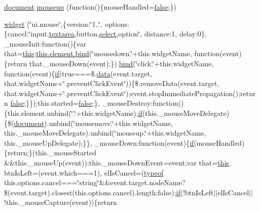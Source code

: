 \begin{DoxyCompactItemize}
\item 
\hyperlink{outside_events_8js_aa14f8e0338cced6720590fd2ea13bd4b}{document} \hyperlink{jquery-ui_8js_a80a041c978d0e433fcd1aa8c4aa91f89}{mouseup} (function()\{mouse\+Handled=\hyperlink{validate_8js_a5df37b7f02e5cdc7d9412b7f872b8e01}{false};\})
\item 
\hyperlink{jquery-ui_8js_a40acf44faeb2d1a4fc7e91ac84caecdc}{widget} (\char`\"{}ui.\+mouse\char`\"{},\{version\+:\char`\"{}1..\char`\"{}, options\+:\{cancel\+:\char`\"{}input,\hyperlink{validate_8js_a7238bc4fc70c702e90c5c654ff465b8d}{textarea},button,\hyperlink{validate_8js_a107b4864f70df98ef4a521c0b2bc80c7}{select},option\char`\"{}, distance\+:1, delay\+:0\}, \+\_\+mouse\+Init\+:function()\{var that=\hyperlink{tinymce_8jquery_8dev_8js_a05c09a5e9d53fa7adf0a7936038c2fa3}{this};\hyperlink{jquery_8mobile-1_83_81_8js_aa28c4555fcf1f84917a1d70644f7174f}{this.\+element.\+bind}(\char`\"{}mousedown.\char`\"{}+this.\+widget\+Name, function(event)\{return that.\+\_\+mouse\+Down(event);\}).\hyperlink{jquery_8mobile-1_83_81_8js_aa28c4555fcf1f84917a1d70644f7174f}{bind}(\char`\"{}click.\char`\"{}+this.\+widget\+Name, function(event)\{\hyperlink{fullpage_2plugin_8js_a8b98017e64ef036adb9ae327ff94abe1}{if}(true===\$.\hyperlink{fullpage_2plugin_8js_a718c1bf5a3bf21ebb980203b142e5b75}{data}(event.\+target, that.\+widget\+Name+\char`\"{}.prevent\+Click\+Event\char`\"{}))\{\$.remove\+Data(event.\+target, that.\+widget\+Name+\char`\"{}.prevent\+Click\+Event\char`\"{});event.\+stop\+Immediate\+Propagation();return \hyperlink{validate_8js_a5df37b7f02e5cdc7d9412b7f872b8e01}{false};\}\});this.\+started=\hyperlink{validate_8js_a5df37b7f02e5cdc7d9412b7f872b8e01}{false};\}, \+\_\+mouse\+Destroy\+:function()\{this.\+element.\+unbind(\char`\"{}.\char`\"{}+this.\+widget\+Name);\hyperlink{fullpage_2plugin_8js_a8b98017e64ef036adb9ae327ff94abe1}{if}(this.\+\_\+mouse\+Move\+Delegate)\{\$(\hyperlink{outside_events_8js_aa14f8e0338cced6720590fd2ea13bd4b}{document}).unbind(\char`\"{}mousemove.\char`\"{}+this.\+widget\+Name, this.\+\_\+mouse\+Move\+Delegate).unbind(\char`\"{}mouseup.\char`\"{}+this.\+widget\+Name, this.\+\_\+mouse\+Up\+Delegate);\}\}, \+\_\+mouse\+Down\+:function(event)\{\hyperlink{fullpage_2plugin_8js_a8b98017e64ef036adb9ae327ff94abe1}{if}(mouse\+Handled)\{return;\}(this.\+\_\+mouse\+Started \&\&this.\+\_\+mouse\+Up(event));this.\+\_\+mouse\+Down\+Event=event;var that=\hyperlink{tinymce_8jquery_8dev_8js_a05c09a5e9d53fa7adf0a7936038c2fa3}{this}, btn\+Is\+Left=(event.\+which===1), el\+Is\+Cancel=(\hyperlink{extras_2_scroller_2media_2docs_2media_2js_2sh_brush_j_script_8js_a93a9266f92d6d68644e7aa63da3caa11}{typeof} this.\+options.\+cancel===\char`\"{}string\char`\"{}\&\&event.\+target.\+node\+Name?\$(event.\+target).closest(this.\+options.\+cancel).length\+:false);\hyperlink{fullpage_2plugin_8js_a8b98017e64ef036adb9ae327ff94abe1}{if}(!btn\+Is\+Left$\vert$$\vert$el\+Is\+Cancel$\vert$$\vert$!this.\+\_\+mouse\+Capture(event))\{return 
\end{DoxyCompactItemize}
